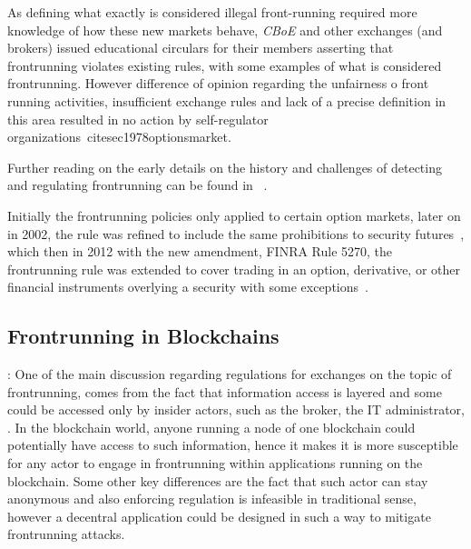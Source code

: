 As defining what exactly is considered illegal front-running required more knowledge of how these new markets behave, \textit{CBoE} and other exchanges (and brokers) issued educational circulars for their members asserting that frontrunning violates existing rules, with some examples of what is considered frontrunning. However difference of opinion regarding the unfairness o front running activities, insufficient exchange rules and lack of a precise definition in this area resulted in no action by self-regulator organizations~cite{sec1978optionsmarket}. 

Further reading on the early details on the history and challenges of detecting and regulating frontrunning can be found in~\cite{markham1988front} . %


Initially the frontrunning policies only applied to certain option markets, later on in 2002, the rule was refined to include the same prohibitions to security futures~\cite{finra_2002}, which then in 2012 with the new amendment, FINRA Rule 5270, the frontrunning rule was extended to cover trading in an option, derivative, or other financial instruments overlying a security with some exceptions~\cite{finra_2012, sec2012frontrunning}. 



\subsection{Frontrunning in Blockchains}: One of the main discussion regarding regulations for exchanges on the topic of frontrunning, comes from the fact that information access is layered and some could be accessed only by insider actors, such as the broker, the IT administrator, \etc. In the blockchain world, anyone running a node of one blockchain could potentially have access to such information, hence it makes it is more susceptible for any actor to engage in frontrunning within applications running on the blockchain. Some other key differences are the fact that such actor can stay anonymous and also enforcing regulation is infeasible in traditional sense, however a decentral application could be designed in such a way to mitigate frontrunning attacks. 




